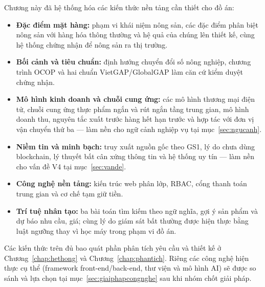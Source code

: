Chương này đã hệ thống hóa các kiến thức nền tảng cần thiết cho đồ án:
\begin{itemize}
    \item \textbf{Đặc điểm mặt hàng:} phạm vi khái niệm nông sản, các đặc điểm phân biệt nông sản với hàng hóa thông thường và hệ quả của chúng lên thiết kế, cùng hệ thống chứng nhận để nông sản ra thị trường.
    \item \textbf{Bối cảnh và tiêu chuẩn:} định hướng chuyển đổi số nông nghiệp, chương trình OCOP và hai chuẩn VietGAP/GlobalGAP làm căn cứ kiểm duyệt chứng nhận.
    \item \textbf{Mô hình kinh doanh và chuỗi cung ứng:} các mô hình thương mại điện tử, chuỗi cung ứng thực phẩm ngắn và rút ngắn tầng trung gian, mô hình doanh thu, nguyên tắc xuất trước hàng hết hạn trước và hợp tác với đơn vị vận chuyển thứ ba --- làm nền cho ngữ cảnh nghiệp vụ tại mục~\ref{sec:ngucanh}.
    \item \textbf{Niềm tin và minh bạch:} truy xuất nguồn gốc theo GS1, lý do chưa dùng blockchain, lý thuyết bất cân xứng thông tin và hệ thống uy tín --- làm nền cho vấn đề V4 tại mục~\ref{sec:vande}.
    \item \textbf{Công nghệ nền tảng:} kiến trúc web phân lớp, RBAC, cổng thanh toán trung gian và cơ chế tạm giữ tiền.
    \item \textbf{Trí tuệ nhân tạo:} ba bài toán tìm kiếm theo ngữ nghĩa, gợi ý sản phẩm và dự báo nhu cầu, giá; cùng lý do giám sát bất thường được hiện thực bằng luật ngưỡng thay vì học máy trong phạm vi đồ án.
\end{itemize}
Các kiến thức trên đủ bao quát phần phân tích yêu cầu và thiết kế ở Chương~\ref{chap:hethong} và Chương~\ref{chap:phantich}. Riêng các công nghệ hiện thực cụ thể (framework front-end/back-end, thư viện và mô hình AI) sẽ được so sánh và lựa chọn tại mục~\ref{sec:giaiphapcongnghe} sau khi nhóm chốt giải pháp.
